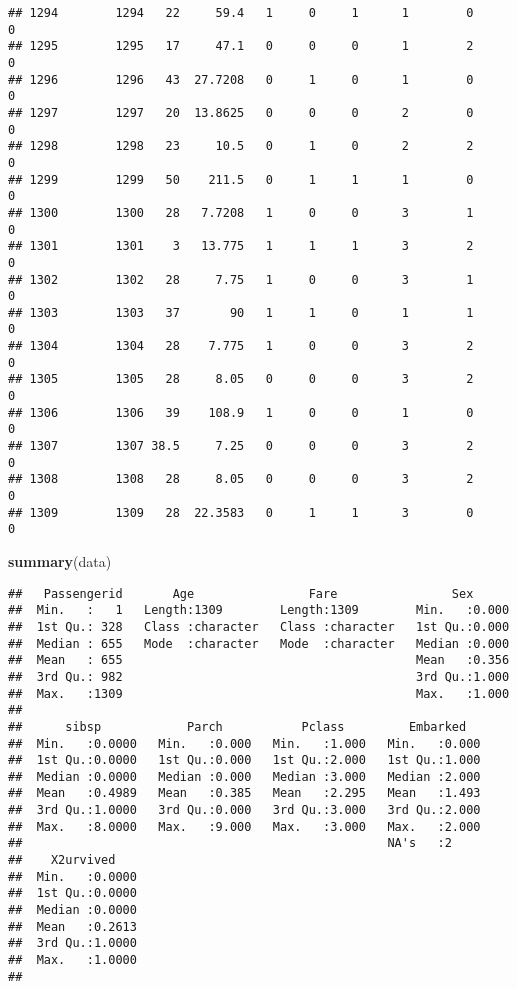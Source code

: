 \documentclass[
]{article}
\newenvironment{Shaded}{\begin{snugshade}}{\end{snugshade}}
\newcommand{\FunctionTok}[1]{\textcolor[rgb]{0.13,0.29,0.53}{\textbf{#1}}}
\newcommand{\NormalTok}[1]{#1}
\begin{document}
\begin{verbatim}
## 1294        1294   22     59.4   1     0     1      1        0         0
## 1295        1295   17     47.1   0     0     0      1        2         0
## 1296        1296   43  27.7208   0     1     0      1        0         0
## 1297        1297   20  13.8625   0     0     0      2        0         0
## 1298        1298   23     10.5   0     1     0      2        2         0
## 1299        1299   50    211.5   0     1     1      1        0         0
## 1300        1300   28   7.7208   1     0     0      3        1         0
## 1301        1301    3   13.775   1     1     1      3        2         0
## 1302        1302   28     7.75   1     0     0      3        1         0
## 1303        1303   37       90   1     1     0      1        1         0
## 1304        1304   28    7.775   1     0     0      3        2         0
## 1305        1305   28     8.05   0     0     0      3        2         0
## 1306        1306   39    108.9   1     0     0      1        0         0
## 1307        1307 38.5     7.25   0     0     0      3        2         0
## 1308        1308   28     8.05   0     0     0      3        2         0
## 1309        1309   28  22.3583   0     1     1      3        0         0
\end{verbatim}

\begin{Shaded}
\begin{Highlighting}[]
\FunctionTok{summary}\NormalTok{(data)}
\end{Highlighting}
\end{Shaded}

\begin{verbatim}
##   Passengerid       Age                Fare                Sex       
##  Min.   :   1   Length:1309        Length:1309        Min.   :0.000  
##  1st Qu.: 328   Class :character   Class :character   1st Qu.:0.000  
##  Median : 655   Mode  :character   Mode  :character   Median :0.000  
##  Mean   : 655                                         Mean   :0.356  
##  3rd Qu.: 982                                         3rd Qu.:1.000  
##  Max.   :1309                                         Max.   :1.000  
##                                                                      
##      sibsp            Parch           Pclass         Embarked    
##  Min.   :0.0000   Min.   :0.000   Min.   :1.000   Min.   :0.000  
##  1st Qu.:0.0000   1st Qu.:0.000   1st Qu.:2.000   1st Qu.:1.000  
##  Median :0.0000   Median :0.000   Median :3.000   Median :2.000  
##  Mean   :0.4989   Mean   :0.385   Mean   :2.295   Mean   :1.493  
##  3rd Qu.:1.0000   3rd Qu.:0.000   3rd Qu.:3.000   3rd Qu.:2.000  
##  Max.   :8.0000   Max.   :9.000   Max.   :3.000   Max.   :2.000  
##                                                   NA's   :2      
##    X2urvived     
##  Min.   :0.0000  
##  1st Qu.:0.0000  
##  Median :0.0000  
##  Mean   :0.2613  
##  3rd Qu.:1.0000  
##  Max.   :1.0000  
## 
\end{verbatim}
\end{document}
